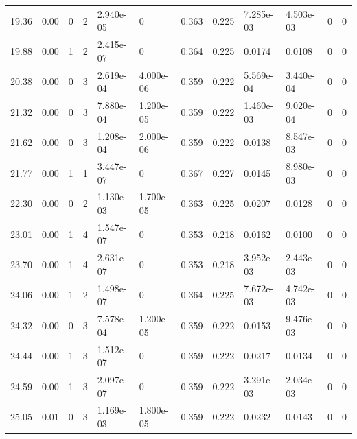 \documentclass[preview]{standalone}
\begin{document}
{{\begin{tabular}{L{1.2cm}C{1.2cm} C{0.3cm}C{0.5cm} C{1.4cm}C{1.4cm} C{1.4cm}C{1.4cm} C{1.6cm}C{1.6cm} C{1.6cm}C{1.6cm}}
  19.36  &  0.00  & 0     &  2 &  2.940e-05  & 0  &  0.363&   0.225& 7.285e-03 & 4.503e-03   &  0 & 0  \\ 
  19.88  &  0.00  & 1     &  2 &  2.415e-07  & 0  &  0.364&   0.225& 0.0174 & 0.0108   &  0 & 0  \\ 
  20.38  &  0.00  & 0     &  3 &  2.619e-04  & 4.000e-06  &  0.359&   0.222& 5.569e-04 & 3.440e-04   &  0 & 0  \\ 
  21.32  &  0.00  & 0     &  3 &  7.880e-04  & 1.200e-05  &  0.359&   0.222& 1.460e-03 & 9.020e-04   &  0 & 0  \\ 
  21.62  &  0.00  & 0     &  3 &  1.208e-04  & 2.000e-06  &  0.359&   0.222& 0.0138 & 8.547e-03   &  0 & 0  \\ 
  21.77  &  0.00  & 1     &  1 &  3.447e-07  & 0  &  0.367&   0.227& 0.0145 & 8.980e-03   &  0 & 0  \\ 
  22.30  &  0.00  & 0     &  2 &  1.130e-03  & 1.700e-05  &  0.363&   0.225& 0.0207 & 0.0128   &  0 & 0  \\ 
  23.01  &  0.00  & 1     &  4 &  1.547e-07  & 0  &  0.353&   0.218& 0.0162 & 0.0100   &  0 & 0  \\ 
  23.70  &  0.00  & 1     &  4 &  2.631e-07  & 0  &  0.353&   0.218& 3.952e-03 & 2.443e-03   &  0 & 0  \\ 
  24.06  &  0.00  & 1     &  2 &  1.498e-07  & 0  &  0.364&   0.225& 7.672e-03 & 4.742e-03   &  0 & 0  \\ 
  24.32  &  0.00  & 0     &  3 &  7.578e-04  & 1.200e-05  &  0.359&   0.222& 0.0153 & 9.476e-03   &  0 & 0  \\ 
  24.44  &  0.00  & 1     &  3 &  1.512e-07  & 0  &  0.359&   0.222& 0.0217 & 0.0134   &  0 & 0  \\ 
  24.59  &  0.00  & 1     &  3 &  2.097e-07  & 0  &  0.359&   0.222& 3.291e-03 & 2.034e-03   &  0 & 0  \\ 
  25.05  &  0.01  & 0     &  3 &  1.169e-03  & 1.800e-05  &  0.359&   0.222& 0.0232 & 0.0143   &  0 & 0  \\ 
\hline 
\end{tabular} 

}}
\end{document}
